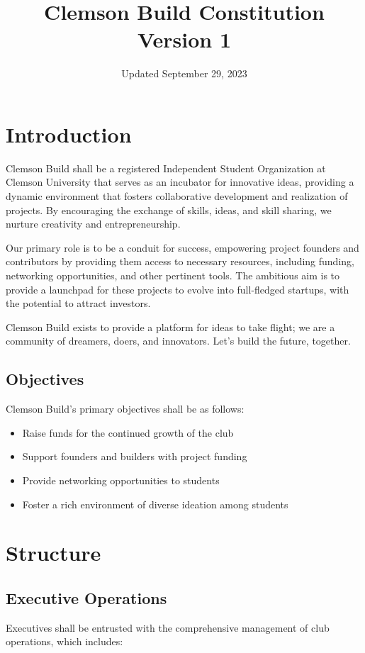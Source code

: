 \documentclass{article}
\title{Clemson Build Constitution \\
\large Version 1}
\date{Updated September 29, 2023}
\begin{document}
\maketitle

\section{Introduction}
Clemson Build shall be a registered Independent Student Organization at Clemson University that serves as an incubator for innovative ideas, providing a dynamic environment that fosters collaborative development and realization of projects. By encouraging the exchange of skills, ideas, and skill sharing, we nurture creativity and entrepreneurship.

Our primary role is to be a conduit for success, empowering project founders and contributors by providing them access to necessary resources, including funding, networking opportunities, and other pertinent tools. The ambitious aim is to provide a launchpad for these projects to evolve into full-fledged startups, with the potential to attract investors.

Clemson Build exists to provide a platform for ideas to take flight; we are a community of dreamers, doers, and innovators. Let's build the future, together.
\subsection{Objectives}
Clemson Build's primary objectives shall be as follows:

\begin{itemize}
    \item{Raise funds for the continued growth of the club}
    \item{Support founders and builders with project funding}
    \item{Provide networking opportunities to students}
    \item{Foster a rich environment of diverse ideation among students}
\end{itemize}

\newpage

\section{Structure}

\subsection{Executive Operations}
Executives shall be entrusted with the comprehensive management of club operations, which includes:
\end{document}
